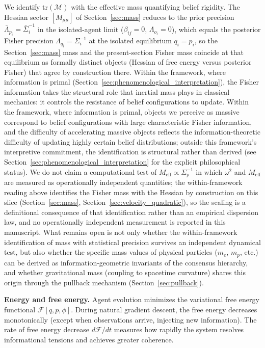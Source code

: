 \documentclass[11pt]{article}
\begin{document}
We identify $\mathrm{tr}(\mathcal{M})$ with the effective mass quantifying belief rigidity. The Hessian sector $[M_{\mu\mu}]$ of Section~\ref{sec:mass} reduces to the prior precision $\bar{\Lambda}_{p_i} = \bar{\Sigma}_i^{-1}$ in the isolated-agent limit ($\beta_{ij} = 0$, $\Lambda_{o_i} = 0$), which equals the posterior Fisher precision $\Lambda_{q_i} = \Sigma_i^{-1}$ at the isolated equilibrium $q_i = p_i$, so the Section~\ref{sec:mass} mass and the present-section Fisher mass coincide at that equilibrium as formally distinct objects (Hessian of free energy versus posterior Fisher) that agree by construction there. Within the framework, where information is primal (Section~\ref{sec:phenomenological_interpretation}), the Fisher information takes the structural role that inertial mass plays in classical mechanics: it controls the resistance of belief configurations to update. Within the framework, where information is primal, objects we perceive as massive correspond to belief configurations with large characteristic Fisher information, and the difficulty of accelerating massive objects reflects the information-theoretic difficulty of updating highly certain belief distributions; outside this framework's interpretive commitment, the identification is structural rather than derived (see Section~\ref{sec:phenomenological_interpretation} for the explicit philosophical status). We do not claim a computational test of $M_{\mathrm{eff}} \propto \Sigma_p^{-1}$ in which $\omega^2$ and $M_{\mathrm{eff}}$ are measured as operationally independent quantities; the within-framework reading above identifies the Fisher mass with the Hessian by construction on this slice (Section~\ref{sec:mass}, Section~\ref{sec:velocity_quadratic}), so the scaling is a definitional consequence of that identification rather than an empirical dispersion law, and no operationally independent measurement is reported in this manuscript. What remains open is not only whether the within-framework identification of mass with statistical precision survives an independent dynamical test, but also whether the specific mass values of physical particles ($m_e$, $m_p$, etc.) can be derived as information-geometric invariants of the consensus hierarchy, and whether gravitational mass (coupling to spacetime curvature) shares this origin through the pullback mechanism (Section~\ref{sec:pullback}).

\textbf{Energy and free energy.} Agent evolution minimizes the variational free energy functional $\mathcal{F}[q, p, \phi]$. During natural gradient descent, the free energy decreases monotonically (except when observations arrive, injecting new information). The rate of free energy decrease $d\mathcal{F}/dt$ measures how rapidly the system resolves informational tensions and achieves greater coherence.
\end{document}
